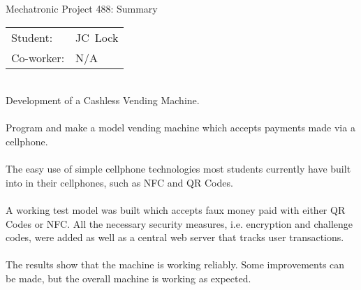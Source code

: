 
\begin{Summary}{Mechatronic Project 488: Summary}

   \noindent
   \begin{tabular}{@{}ll@{}}
      \textsf{Student:}  &  JC\ Lock\\
      \textsf{Co-worker:} & N/A
   \end{tabular}

\begin{SumTable}
 \hline%
 \\
 \hline%
 Development of a Cashless Vending Machine.
 \\

 \hline%
 \\
 \hline%
 Program and make a model vending machine which accepts payments made via a cellphone.
 \\

 \hline%
 \\
 \hline%
 The easy use of simple cellphone technologies most students currently have built into in their
 cellphones, such as NFC and QR Codes.
 \\
   
 \hline%
 \\
 \hline%
 A working test model was built which accepts faux money paid with either QR Codes or NFC. All
 the necessary security measures, i.e. encryption and challenge codes, were added as well as a
 central web server that tracks user transactions.
 \\

 \hline%
 \\
 \hline%
 The results show that the machine is working reliably. Some improvements can be made, but the
 overall machine is working as expected.
 \\


\end{SumTable}
\end{Summary}
